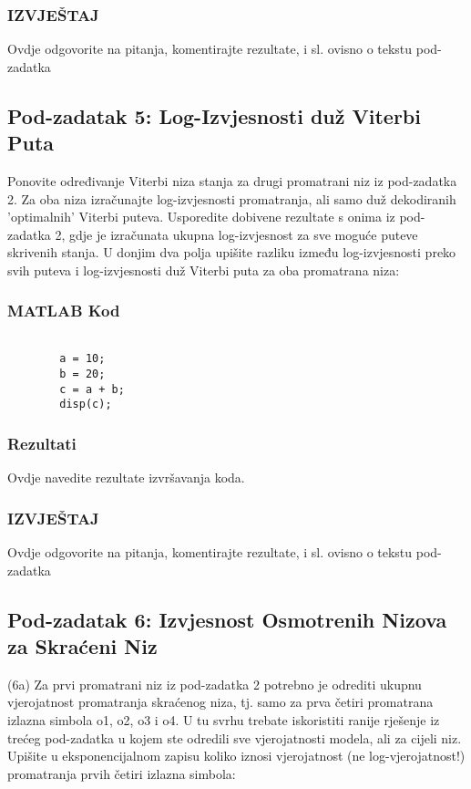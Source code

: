 \documentclass[12pt]{article}
\begin{document}
	\subsubsection*{IZVJEŠTAJ}
	Ovdje odgovorite na pitanja, komentirajte rezultate, i sl. ovisno o tekstu pod-zadatka
	
	\subsection{Pod-zadatak 5: Log-Izvjesnosti duž Viterbi Puta}
	Ponovite određivanje Viterbi niza stanja za drugi promatrani niz iz pod-zadatka 2. Za oba niza izračunajte log-izvjesnosti promatranja, ali samo duž dekodiranih 'optimalnih' Viterbi puteva. Usporedite dobivene rezultate s onima iz pod-zadatka 2, gdje je izračunata ukupna log-izvjesnost za sve moguće puteve skrivenih stanja. U donjim dva polja upišite razliku između log-izvjesnosti preko svih puteva i log-izvjesnosti duž Viterbi puta za oba promatrana niza:
	
	\subsubsection*{MATLAB Kod}
	\begin{lstlisting}
		
		a = 10;
		b = 20;
		c = a + b;
		disp(c);
	\end{lstlisting}
	
	\subsubsection*{Rezultati}
	Ovdje navedite rezultate izvršavanja koda.
	
	\subsubsection*{IZVJEŠTAJ}
	Ovdje odgovorite na pitanja, komentirajte rezultate, i sl. ovisno o tekstu pod-zadatka
	
	\subsection{Pod-zadatak 6: Izvjesnost Osmotrenih Nizova za Skraćeni Niz}
	(6a) Za prvi promatrani niz iz pod-zadatka 2 potrebno je odrediti ukupnu vjerojatnost promatranja skraćenog niza, tj. samo za prva četiri promatrana izlazna simbola o1, o2, o3 i o4. U tu svrhu trebate iskoristiti ranije rješenje iz trećeg pod-zadatka u kojem ste odredili sve vjerojatnosti modela, ali za cijeli niz. Upišite u eksponencijalnom zapisu koliko iznosi vjerojatnost (ne log-vjerojatnost!) promatranja prvih četiri izlazna simbola:
	
\end{document}
